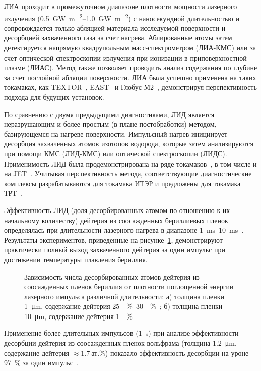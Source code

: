 ЛИА проходит в промежуточном диапазоне плотности мощности лазерного излучения (\SIrange{0.5}{1.0}{\giga\watt\per\meter\squared}) с наносекундной длительностью и сопровождается только абляцией материала исследуемой поверхности и десорбцией захваченного газа за счет нагрева. Аблированные атомы затем детектируется напрямую квадрупольным масс-спектрометром (ЛИА-КМС) или за счет оптической спектроскопии излучения при ионизации в приповерхностной плазме (ЛИАС). Метод также позволяет проводить анализ содержания по глубине за счет послойной абляции поверхности. ЛИА была успешно применена на таких токамаках, как TEXTOR~\cite{Gierse2016}, EAST~\cite{Hu2018} и Глобус-М2~\cite{Medvedev2024}, демонстрируя перспективность подхода для будущих установок. 

По сравнению с двумя предыдущими диагностиками, ЛИД является неразрушающим и более простым (в плане постобработки) методом, базирующемся на нагреве поверхности. Импульсный нагрев инициирует десорбция захваченных атомов изотопов водорода, которые затем анализируются при помощи КМС (ЛИД-КМС) или оптической спектроскопии (ЛИДС). Применимость ЛИД была продемонстрирована на ряде токамаков~\cite{Schweer2009, Medvedev2024}, в том числе и на JET~\cite{Zlobinski2024}. Учитывая перспективность метода, соответствующие диагностические комплексы разрабатываются для токамака ИТЭР и предложены для токамака ТРТ~\cite{Razdobarin2022}. 

Эффективность ЛИД (доля десорбированных атомом по отношению к их начальному количеству) дейтерия из соосажденных бериллиевых пленок определялась при длительности лазерного нагрева в диапазоне \SIrange{1}{10}{\milli\second}~\cite{Zlobinski2019, Zlobinski2020}. Результаты экспериментов, приведенные на рисунке~\cref{fig:ch1/LID_efficiency}, демонстрируют практически полный выход захваченного дейтерия за один импульс при достижении температуры плавления бериллия. 
\begin{figure}[ht]
    \caption{Зависимость числа десорбированных атомов дейтерия из соосажденных пленок бериллия от плотности поглощенной энергии лазерного импульса различной длительности: а) толщина пленки \SI{1}{\micro\meter}, содержание дейтерия \SIrange{25}{30}{\percent}~\cite{Zlobinski2019}; б) толщина пленки \SI{10}{\micro\meter}, содержание дейтерия \SI{1}{\percent}~\cite{Zlobinski2020}}\label{fig:ch1/LID_efficiency}
\end{figure}
Применение более длительных импульсов (\SI{1}{\second}) при анализе эффективности десорбции дейтерия из соосажденных пленок вольфрама (толщина \SI{1.2}{\micro\meter}, содержание дейтерия \( \approx \SI{1.7}{\text{ат.}\percent} \)) показало эффективность десорбции на уроне \SI{97}{\percent} за один импульс~\cite{Yu2019}.

